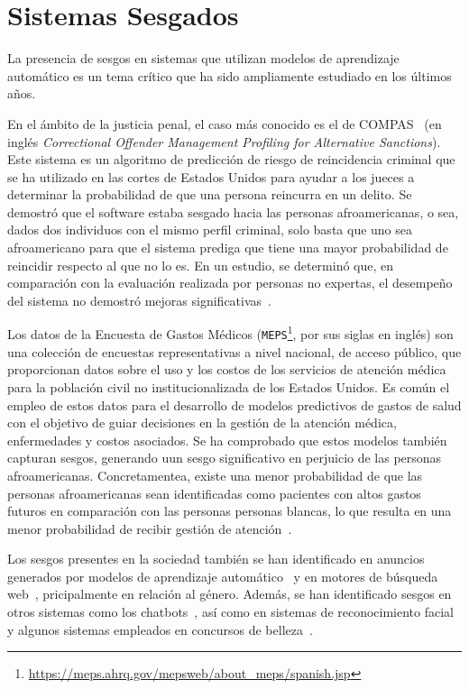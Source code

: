 \section{Sistemas Sesgados}

    La presencia de sesgos en sistemas que utilizan modelos de aprendizaje autom\'atico es un tema cr\'itico que ha sido
    ampliamente estudiado en los \'ultimos a\~nos. 
    
    En el \'ambito de la justicia penal, el caso m\'as conocido es el de COMPAS~\parencite{propublica}
    (en ingl\'es \emph{Correctional Offender Management Profiling for Alternative Sanctions}). Este sistema es un algoritmo de predicci\'on
    de riesgo de reincidencia criminal que se ha utilizado en las cortes de Estados Unidos para ayudar a los jueces a determinar la 
    probabilidad de que una persona reincurra en un delito. Se demostr\'o que el software estaba sesgado hacia las personas 
    afroamericanas, o sea, dados dos individuos con el mismo perfil criminal, solo basta que uno sea afroamericano para que el
    sistema prediga que tiene una mayor probabilidad de reincidir respecto al que no lo es. En un estudio, se determin\'o que, 
    en comparaci\'on con la evaluaci\'on realizada por personas no expertas, el desempe\~no del sistema no demostr\'o mejoras 
    significativas~\parencite{compas2}. 
    
    Los datos de la Encuesta de Gastos M\'edicos (\texttt{MEPS}\footnote{\url{https://meps.ahrq.gov/mepsweb/about_meps/spanish.jsp}}, 
    por sus siglas en ingl\'es) son una colecci\'on de encuestas representativas a nivel nacional, de acceso p\'ublico, que proporcionan 
    datos sobre el uso y los costos de los servicios de atenci\'on m\'edica para la poblaci\'on civil no institucionalizada de los Estados Unidos. 
    Es com\'un el empleo de estos datos para el desarrollo de modelos predictivos de gastos de salud con el objetivo de guiar decisiones 
    en la gesti\'on de la atenci\'on m\'edica, enfermedades y costos asociados. Se ha comprobado que estos modelos tambi\'en capturan sesgos, 
    generando uun sesgo significativo en perjuicio de las personas afroamericanas. Concretamentea, existe una menor probabilidad de que 
    las personas afroamericanas sean identificadas como pacientes con altos gastos futuros en comparaci\'on con las personas personas blancas, 
    lo que resulta en una menor probabilidad de recibir gesti\'on de atenci\'on~\parencite{understanding}.

    Los sesgos presentes en la sociedad tambi\'en se han identificado en anuncios generados por modelos de aprendizaje 
    autom\'atico~\parencite{sweeney2013discrimination,datta2015automated} y en motores de b\'usqueda web~\parencite{unequal_rep}, 
    pricipalmente en relaci\'on al g\'enero. Adem\'as, se han identificado sesgos en otros sistemas como los 
    chatbots~\parencite{chatbot_bias}, as\'i como en sistemas de reconocimiento facial~\parencite{facial_bias} y algunos 
    sistemas empleados en concursos de belleza~\parencite{beauty}.

